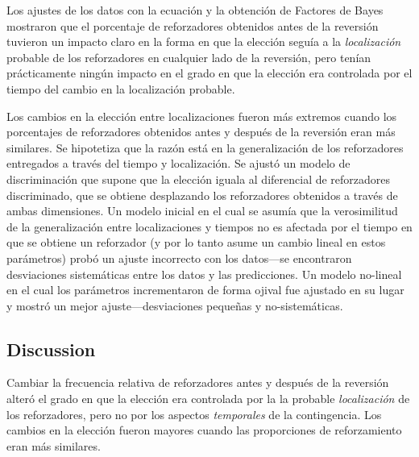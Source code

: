 \documentclass[a4paper,12pt]{article}
\begin{document}
Los ajustes de los datos con la ecuación y la obtención de Factores de Bayes mostraron que el porcentaje de reforzadores obtenidos antes de la reversión tuvieron un impacto claro en la forma en que la elección seguía a la {\itshape localización} probable de los reforzadores en cualquier lado de la reversión, pero tenían prácticamente ningún impacto en el grado en que la elección era controlada por el tiempo del cambio en la localización probable.

Los cambios en la elección entre localizaciones fueron más extremos cuando los porcentajes de reforzadores obtenidos antes y después de la reversión eran más similares.
Se hipotetiza que la razón está en la generalización de los reforzadores entregados a través del tiempo y localización.
Se ajustó un modelo de discriminación que supone que la elección iguala al diferencial de reforzadores discriminado, que se obtiene desplazando los reforzadores obtenidos a través de ambas dimensiones.
Un modelo inicial en el cual se asumía que la verosimilitud de la generalización entre localizaciones y tiempos no es afectada por el tiempo en que se obtiene un reforzador (y por lo tanto asume un cambio lineal en estos parámetros) probó un ajuste incorrecto con los datos---se encontraron desviaciones sistemáticas entre los datos y las predicciones.
Un modelo no-lineal en el cual los parámetros incrementaron de forma ojival fue ajustado en su lugar y mostró un mejor ajuste---desviaciones pequeñas y no-sistemáticas.

\subsection{Discussion}

Cambiar la frecuencia relativa de reforzadores antes y después de la reversión alteró el grado en que la elección era controlada por la la probable {\itshape localización} de los reforzadores, pero no por los aspectos {\itshape temporales} de la contingencia.
Los cambios en la elección fueron mayores cuando las proporciones de reforzamiento eran más similares.
\end{document}
